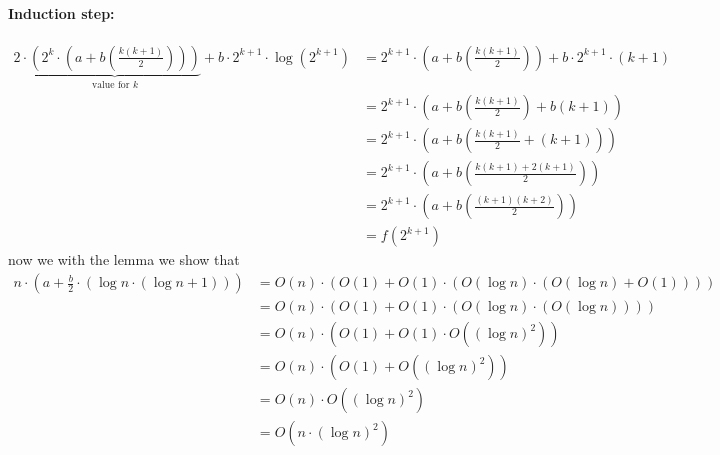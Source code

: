\documentclass{article}
\begin{document}
\begin{enumerate}
{\begin{enumerate}[label={(\arabic*)}]
{                    \paragraph*{Induction step:}
                    \begin{displaymath}
                        \begin{aligned}
                            2\cdot\underbrace{\left(2^k\cdot \left(a + b\left(\frac{k(k+1)}{2}\right)\right)\right)}_{\text{value for }k} + b\cdot2^{k+1}\cdot\log(2^{k+1})
                            &= 2^{k+1}\cdot \left(a + b\left(\frac{k(k+1)}{2}\right)\right) + b\cdot2^{k+1}\cdot(k+1) \\
                            &= 2^{k+1}\cdot \left(a + b\left(\frac{k(k+1)}{2}\right) + b(k+1) \right) \\
                            &= 2^{k+1}\cdot \left(a + b\left(\frac{k(k+1)}{2} + (k+1)\right) \right) \\
                            &= 2^{k+1}\cdot \left(a + b\left(\frac{k(k+1) + 2(k+1)}{2}\right) \right) \\
                            &= 2^{k+1}\cdot \left(a + b\left(\frac{(k + 1)(k + 2)}{2}\right) \right) \\
                            &= f(2^{k+1})
                        \end{aligned}
                    \end{displaymath}
                    now we with the lemma we show that
                    \begin{displaymath}
                        \begin{aligned}
                            n\cdot\left(a+\frac{b}{2}\cdot\left(\log n\cdot(\log n+1)\right)\right)
                            &= O(n) \cdot \left( O(1) + O(1) \cdot \left(O(\log n)\cdot (O(\log n) + O(1))\right) \right) \\
                            &= O(n) \cdot \left( O(1) + O(1) \cdot \left(O(\log n)\cdot (O(\log n))\right) \right) \\
                            &= O(n) \cdot \left( O(1) + O(1) \cdot O((\log n)^2) \right) \\
                            &= O(n) \cdot \left( O(1) + O((\log n)^2) \right) \\
                            &= O(n) \cdot O((\log n)^2) \\
                            &= O(n \cdot (\log n)^2) \\
                        \end{aligned}

\end{displaymath}}
\end{enumerate}}
\end{enumerate}
\end{document}
